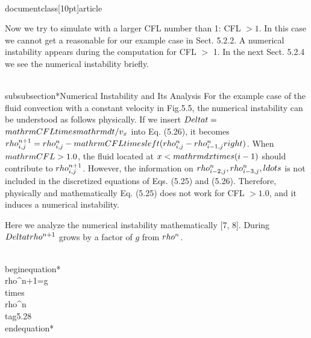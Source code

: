 \\documentclass[10pt]{article}
\begin{document}
{Now we try to simulate with a larger CFL number than 1: CFL $>1$. In this case we cannot get a reasonable for our example case in Sect. 5.2.2. A numerical instability appears during the computation for CFL $>$ 1. In the next Sect. 5.2.4 we see the numerical instability briefly.

\\subsubsection*{Numerical Instability and Its Analysis}
For the example case of the fluid convection with a constant velocity in Fig.5.5, the numerical instability can be understood as follows physically. If we insert $\\Delta t=$ $\\mathrm{CFL} \\times \\mathrm{d} t / v_{x}$ into Eq. (5.26), it becomes $\\rho_{i, j}^{n+1}=\\rho_{i, j}^{n}-\\mathrm{CFL} \\times\\left(\\rho_{i, j}^{n}-\\rho_{i-1, j}^{n}\\right)$. When $\\mathrm{CFL}>1.0$, the fluid located at $x<\\mathrm{d} x \\times(i-1)$ should contribute to $\\rho_{i, j}^{n+1}$. However, the information on $\\rho_{i-2, j}^{n}, \\rho_{i-3, j}^{n}, \\ldots$ is not included in the discretized equations of Eqs. (5.25) and (5.26). Therefore, physically and mathematically Eq. (5.25) does not work for CFL $>1.0$, and it induces a numerical instability.

Here we analyze the numerical instability mathematically [7, 8]. During $\\Delta t \\rho^{n+1}$ grows by a factor of $g$ from $\\rho^{n}$.


\\begin{equation*}
\\rho^{n+1}=g \\times \\rho^{n} \\tag{5.28}
\\end{equation*}


}
\end{document}
